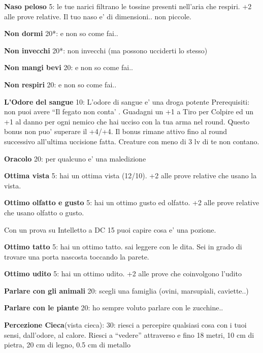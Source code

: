 \documentclass[a4paper,11pt,twoside,openany]{dndbook}
\begin{document}
\textbf{Naso peloso} 5: le tue narici filtrano le tossine presenti nell'aria che respiri. +2 alle prove relative. Il tuo naso e' di dimensioni.. non piccole.

\textbf{Non dormi} 20{*}: e non so come fai..

\textbf{Non invecchi} 20{*}: non invecchi (ma possono ucciderti lo stesso)

\textbf{Non mangi bevi} 20: e non so come fai..

\textbf{Non respiri} 20: e non so come fai..

\textbf{L'Odore del sangue} 10: L'odore di sangue e' una droga potente
Prerequisiti: non puoi avere ``Il fegato non conta' . Guadagni un +1 a Tiro per Colpire ed un +1 al danno per ogni nemico che hai ucciso con la tua arma nel round. Questo bonus non puo' superare il +4/+4. Il bonus rimane attivo fino al round successivo all'ultima uccisione fatta. Creature con meno di 3 lv di te non contano.

\textbf{Oracolo} 20: per qualcuno e' una maledizione

\textbf{Ottima vista} 5: hai un ottima vista (12/10). +2 alle prove relative che usano la vista.

\textbf{Ottimo olfatto e gusto} 5: hai un ottimo gusto ed olfatto. +2 alle prove relative che usano olfatto o gusto.

Con un prova su Intelletto a DC 15 puoi capire cosa e' una pozione.

\textbf{Ottimo tatto} 5: hai un ottimo tatto. sai leggere con le dita. Sei in grado di trovare una porta nascosta toccando la parete.

\textbf{Ottimo udito} 5: hai un ottimo udito. +2 alle prove che coinvolgono l'udito

\textbf{Parlare con gli animali} 20: scegli una famiglia (ovini, marsupiali, caviette..)

\textbf{Parlare con le piante} 20: ho sempre voluto parlare con le zucchine..

\textbf{Percezione Cieca}(vista cieca): 30: riesci a percepire qualsiasi cosa con i tuoi sensi, dall’odore, al calore. Riesci a “vedere” attraverso e fino 18 metri, 10 cm di pietra, 20 cm di legno, 0.5 cm di metallo
\end{document}

